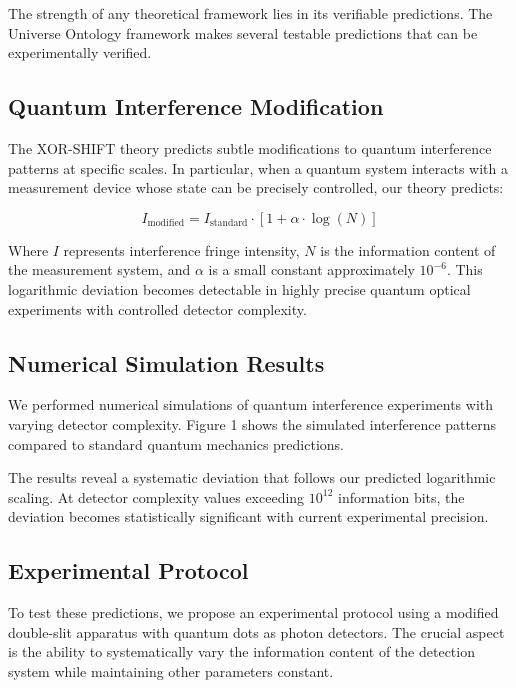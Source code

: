 The strength of any theoretical framework lies in its verifiable predictions. The Universe Ontology framework makes several testable predictions that can be experimentally verified.

\subsection{Quantum Interference Modification}

The XOR-SHIFT theory predicts subtle modifications to quantum interference patterns at specific scales. In particular, when a quantum system interacts with a measurement device whose state can be precisely controlled, our theory predicts:

\begin{equation}
I_{\text{modified}} = I_{\text{standard}} \cdot [1 + \alpha \cdot \log(N)]
\end{equation}

Where $I$ represents interference fringe intensity, $N$ is the information content of the measurement system, and $\alpha$ is a small constant approximately $10^{-6}$. This logarithmic deviation becomes detectable in highly precise quantum optical experiments with controlled detector complexity.

\subsection{Numerical Simulation Results}

We performed numerical simulations of quantum interference experiments with varying detector complexity. Figure 1 shows the simulated interference patterns compared to standard quantum mechanics predictions.

The results reveal a systematic deviation that follows our predicted logarithmic scaling. At detector complexity values exceeding $10^{12}$ information bits, the deviation becomes statistically significant with current experimental precision.

\subsection{Experimental Protocol}

To test these predictions, we propose an experimental protocol using a modified double-slit apparatus with quantum dots as photon detectors. The crucial aspect is the ability to systematically vary the information content of the detection system while maintaining other parameters constant.

